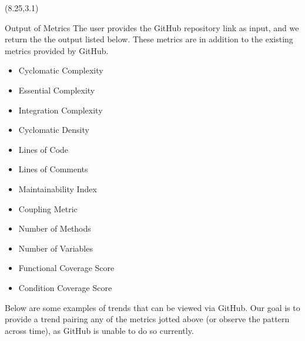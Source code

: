 \documentclass[22pt]{beamer}
\begin{document}
\begin{frame}[fragile]
\begin{textblock}{7.25}(8.25,3.1)
\begin{block}{Output of Metrics}
The user provides the GitHub repository link as input, and we return the the output listed below. These metrics are in addition to the existing metrics provided by GitHub. \newline
\begin{itemize}
\item Cyclomatic Complexity 
\item Essential Complexity 
\item Integration Complexity 
\item Cyclomatic Density
\item Lines of Code 
\item Lines of Comments 
\item Maintainability Index 
\item Coupling Metric 
\item Number of Methods
\item Number of Variables 
\item Functional Coverage Score
\item Condition Coverage Score \newline
\end{itemize}
Below are some examples of trends that can be viewed via GitHub. Our goal is to provide a trend pairing any of the metrics jotted above (or observe the pattern across time), as GitHub is unable to do so currently. 


\end{block}
\end{textblock}
\end{frame}
\end{document}
